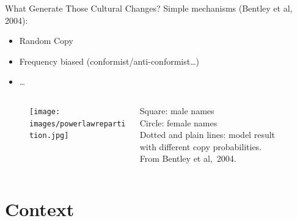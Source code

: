 \documentclass[12pt, notes=show]{beamer}
\begin{document}
\begin{frame}{What Generate Those Cultural Changes?}
	Simple mechanisms (Bentley et al, 2004):
	\begin{itemize}
		\item Random Copy 
		\item Frequency biased (conformist/anti-conformist\dots)
		\item \dots
	\end{itemize}
	\begin{figure}
		\begin{columns}
			\begin{column}{.8\textwidth}
				\centering
				\texttt{[image: images/powerlawrepartition.jpg]}
			\end{column}
			\begin{column}{.3\textwidth}
				\tiny
				Square: male names\\
				Circle: female names\\
				Dotted and plain lines: model result with different copy probabilities.\\
				From Bentley et al,~2004.
			\end{column}
		\end{columns}
	\end{figure}
\end{frame}

\section{Context}
\end{document}
